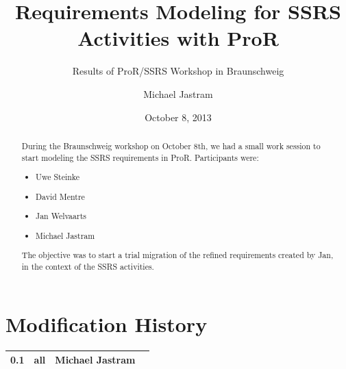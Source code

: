 \documentclass{template/openetcs_article}
\begin{document}
\frontmatter
{}







\title{Requirements Modeling for SSRS Activities with ProR}

\subtitle{Results of ProR/SSRS Workshop in Braunschweig}

\date{October 8, 2013}


\author{Michael Jastram}





\begin{abstract}
During the Braunschweig workshop on October 8th, we had a small work session to start modeling the SSRS requirements in ProR.  Participants were:

\begin{itemize}
\item Uwe Steinke
\item David Mentre
\item Jan Welvaarts
\item Michael Jastram
\end{itemize}

The objective was to start a trial migration of the refined requirements created by Jan, in the context of the SSRS activities.

\end{abstract}

\maketitle

\section*{Modification History}
\begin{supertabular}{| m{1.2cm} | m{1.2cm} | m{6.6cm} | m{4cm} |}
 0.1 & all & Michael Jastram& \\\hline
\end{supertabular}
\end{document}
